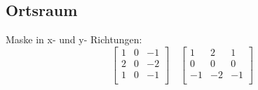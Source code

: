 \documentclass[12pt]{article}
\begin{document}
\subsection{Ortsraum}
Maske in x- und y- Richtungen:
\begin{equation*}
\begin{bmatrix}
1 & 0 & -1  \\
2 & 0 & -2\\
1 & 0 & -1\\
\end{bmatrix} \quad 
\begin{bmatrix}
1 & 2 & 1  \\
0 & 0 & 0\\
-1 & -2 & -1\\
\end{bmatrix}
\end{equation*}
\begin{figure}[ht]\centering
\end{figure}
\newpage
\end{document}
